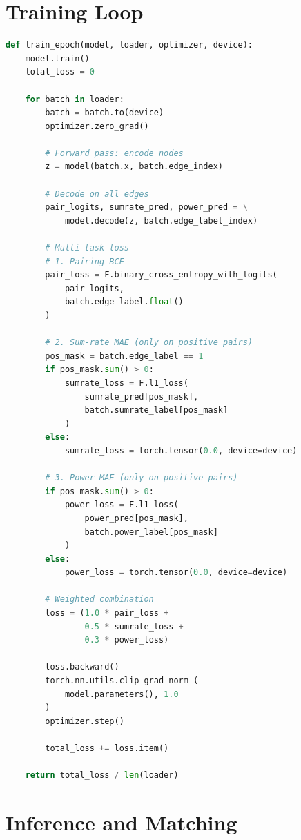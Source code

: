 \section{Training Loop}

\begin{lstlisting}[language=Python, caption={Multi-Task Training Procedure}]
def train_epoch(model, loader, optimizer, device):
    model.train()
    total_loss = 0
    
    for batch in loader:
        batch = batch.to(device)
        optimizer.zero_grad()
        
        # Forward pass: encode nodes
        z = model(batch.x, batch.edge_index)
        
        # Decode on all edges
        pair_logits, sumrate_pred, power_pred = \
            model.decode(z, batch.edge_label_index)
        
        # Multi-task loss
        # 1. Pairing BCE
        pair_loss = F.binary_cross_entropy_with_logits(
            pair_logits, 
            batch.edge_label.float()
        )
        
        # 2. Sum-rate MAE (only on positive pairs)
        pos_mask = batch.edge_label == 1
        if pos_mask.sum() > 0:
            sumrate_loss = F.l1_loss(
                sumrate_pred[pos_mask],
                batch.sumrate_label[pos_mask]
            )
        else:
            sumrate_loss = torch.tensor(0.0, device=device)
        
        # 3. Power MAE (only on positive pairs)
        if pos_mask.sum() > 0:
            power_loss = F.l1_loss(
                power_pred[pos_mask],
                batch.power_label[pos_mask]
            )
        else:
            power_loss = torch.tensor(0.0, device=device)
        
        # Weighted combination
        loss = (1.0 * pair_loss + 
                0.5 * sumrate_loss + 
                0.3 * power_loss)
        
        loss.backward()
        torch.nn.utils.clip_grad_norm_(
            model.parameters(), 1.0
        )
        optimizer.step()
        
        total_loss += loss.item()
    
    return total_loss / len(loader)
\end{lstlisting}

\section{Inference and Matching}

